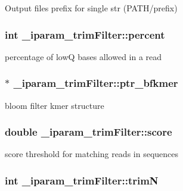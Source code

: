 Output files prefix for single str (P\+A\+T\+H/prefix) \hypertarget{struct__iparam__trimFilter_a8ed026b1de4fccc7288258c3a8faa395}{
\subsubsection[{percent}]{\setlength{\rightskip}{0pt plus 5cm}int \+\_\+iparam\+\_\+trim\+Filter\+::percent}}\label{struct__iparam__trimFilter_a8ed026b1de4fccc7288258c3a8faa395}
percentage of low\+Q bases allowed in a read \hypertarget{struct__iparam__trimFilter_a63b9b54ab69ce2602ec37ececc59e131}{
\subsubsection[{ptr\+\_\+bfkmer}]{$\ast$ \+\_\+iparam\+\_\+trim\+Filter\+::ptr\+\_\+bfkmer}}\label{struct__iparam__trimFilter_a63b9b54ab69ce2602ec37ececc59e131}
bloom filter kmer structure \hypertarget{struct__iparam__trimFilter_a193ef2030f6eb8db0b75afbbd152d6a1}{
\subsubsection[{score}]{\setlength{\rightskip}{0pt plus 5cm}double \+\_\+iparam\+\_\+trim\+Filter\+::score}}\label{struct__iparam__trimFilter_a193ef2030f6eb8db0b75afbbd152d6a1}
score threshold for matching reads in sequences \hypertarget{struct__iparam__trimFilter_a5f2d247cc26608ed5cc9e2d6943940d7}{
\subsubsection[{trim\+N}]{\setlength{\rightskip}{0pt plus 5cm}int \+\_\+iparam\+\_\+trim\+Filter\+::trim\+N}}\label{struct__iparam__trimFilter_a5f2d247cc26608ed5cc9e2d6943940d7}
